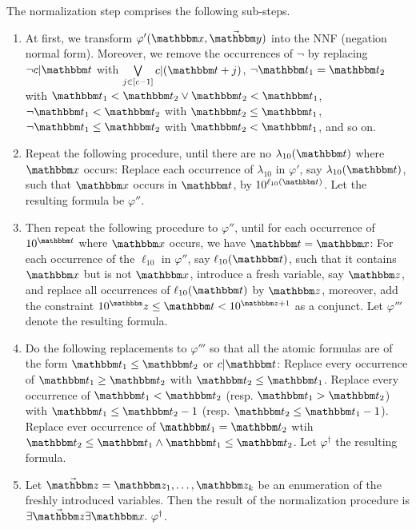 The normalization step comprises the following sub-steps.
\begin{enumerate}
\item At first, we transform $\varphi'(\ivarx,\vec{\ivary})$ into the NNF (negation normal form). Moreover, we remove the occurrences of $\neg$ by replacing $\neg c | \iterm$ with $\bigvee \limits_{j \in [c-1]} c | (\iterm+j)$, $\neg \iterm_1 = \iterm_2$ with $\iterm_1 < \iterm_2 \vee \iterm_2 < \iterm_1$, $\neg \iterm_1 < \iterm_2$ with $\iterm_2 \le \iterm_1$, $\neg \iterm_1 \le \iterm_2$ with $\iterm_2 < \iterm_1$, and so on.
%
\item Repeat the following procedure, until there are no $\lambda_{10}(\iterm)$ where $\ivarx$ occurs: Replace each occurrence of $\lambda_{10}$ in $\varphi'$, say $\lambda_{10}(\iterm)$, such that $\ivarx$ occurs in $\iterm$, by $10^{\ell_{10}(\iterm)}$. Let the resulting formula be $\varphi''$.
%
\item Then repeat the following procedure to $\varphi''$, until for each occurrence of $10^{\iterm}$ where $\ivarx$ occurs, we have $\iterm = \ivarx$: For each occurrence of the $\ell_{10}$ in $\varphi''$, say $\ell_{10}(\iterm)$, such that it contains $\ivarx$ but is not $\ivarx$, introduce a fresh variable, say $\ivarz$, 
and replace all occurrences of $\ell_{10}(\iterm)$ by $\ivarz$, moreover, add the constraint $10^\ivarz \le \iterm < 10^{\ivarz + 1}$ as a conjunct. Let $\varphi'''$ denote the resulting formula.  
%
\item Do the following replacements to $\varphi'''$ so that all the atomic formulas are of the form $\iterm_1 \le \iterm_2$ or $c | \iterm$: Replace every occurrence of $\iterm_1 \ge \iterm_2$ with $\iterm_2 \le \iterm_1$. Replace every occurrence of $\iterm_1 < \iterm_2$ (resp. $\iterm_1 > \iterm_2$) with $\iterm_1 \le \iterm_2 - 1$ (resp. $\iterm_2 \le \iterm_1-1$). Replace ever occurrence of $\iterm_1 = \iterm_2$ wtih $\iterm_2 \le \iterm_1 \wedge \iterm_1 \le \iterm_2$. Let $\varphi^\dag$ the resulting formula. 
%
\item Let $\vec{\ivarz} = \ivarz_1,\ldots, \ivarz_k$ be an enumeration of the freshly introduced variables. Then the result of the normalization procedure is 
$\exists \vec{\ivarz}\exists \ivarx.\ \varphi^\dag$.
\end{enumerate}


